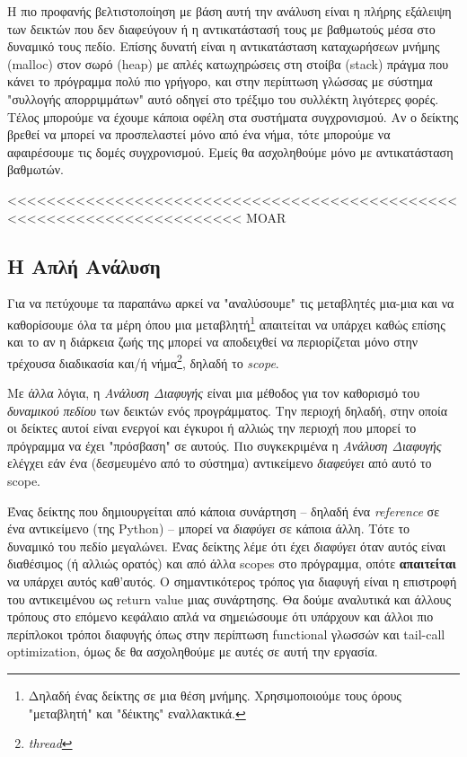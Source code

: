Η πιο προφανής βελτιστοποίηση με βάση αυτή την ανάλυση είναι η πλήρης εξάλειψη
των δεικτών που δεν διαφεύγουν ή η αντικατάστασή τους με βαθμωτούς μέσα στο
δυναμικό τους πεδίο. Επίσης δυνατή είναι η αντικατάσταση καταχωρήσεων μνήμης
(malloc) στον σωρό (heap) με απλές κατωχηρώσεις στη στοίβα (stack) πράγμα που
κάνει το πρόγραμμα πολύ πιο γρήγορο, και στην περίπτωση γλώσσας με σύστημα
"συλλογής απορριμμάτων" αυτό οδηγεί στο τρέξιμο του συλλέκτη λιγότερες φορές.
Τέλος μπορούμε να έχουμε κάποια οφέλη στα συστήματα συγχρονισμού. Αν ο δείκτης
βρεθεί να μπορεί να προσπελαστεί μόνο από ένα νήμα, τότε μπορούμε να 
αφαιρέσουμε τις δομές συγχρονισμού. Εμείς θα ασχοληθούμε μόνο με αντικατάσταση 
βαθμωτών.

<<<<<<<<<<<<<<<<<<<<<<<<<<<<<<<<<<<<<<<<<<<<<<<<<<<<<<<<<<<<<<<<<<<<<< MOAR


\subsection{Η Απλή Ανάλυση}

Για να πετύχουμε τα παραπάνω αρκεί να "αναλύσουμε" τις μεταβλητές μια-μια και
να καθορίσουμε όλα τα μέρη όπου μια μεταβλητή\footnote{Δηλαδή ένας δείκτης σε
μια θέση μνήμης. Χρησιμοποιούμε τους όρους "μεταβλητή" και "δέικτης"
εναλλακτικά.} απαιτείται να υπάρχει καθώς επίσης και το αν η διάρκεια ζωής της
μπορεί να αποδειχθεί να περιορίζεται μόνο στην τρέχουσα διαδικασία και/ή
νήμα\footnote{\textit{thread}}, δηλαδή το \textit{scope}.

Με άλλα λόγια, η \textit{Ανάλυση Διαφυγής} είναι μια μέθοδος για τον καθορισμό
του \textit{δυναμικού πεδίου} των δεικτών ενός προγράμματος. Την περιοχή δηλαδή,
στην οποία οι δείκτες αυτοί είναι ενεργοί και έγκυροι ή αλλιώς την περιοχή που
μπορεί το πρόγραμμα να έχει "πρόσβαση" σε αυτούς. Πιο συγκεκριμένα η
\textit{Ανάλυση Διαφυγής} ελέγχει εάν ένα (δεσμευμένο από το σύστημα)
αντικείμενο \textit{διαφεύγει} από αυτό το scope.

Ένας δείκτης που δημιουργείται από κάποια συνάρτηση – δηλαδή ένα
\textit{reference} σε ένα αντικείμενο (της Python) – μπορεί να \textit{διαφύγει}
σε κάποια άλλη. Τότε το δυναμικό του πεδίο μεγαλώνει. Ένας δείκτης λέμε ότι έχει
\textit{διαφύγει} όταν αυτός είναι διαθέσιμος (ή αλλιώς ορατός) και από άλλα
scopes στο πρόγραμμα, οπότε \textbf{απαιτείται} να υπάρχει αυτός καθ'αυτός. Ο
σημαντικότερος τρόπος για διαφυγή είναι η επιστροφή του αντικειμένου ως return
value μιας συνάρτησης. Θα δούμε αναλυτικά και άλλους τρόπους στο επόμενο
κεφάλαιο απλά να σημειώσουμε ότι υπάρχουν και άλλοι πιο περίπλοκοι τρόποι
διαφυγής όπως στην περίπτωση functional γλωσσών και tail-call optimization, όμως
δε θα ασχοληθούμε με αυτές σε αυτή την εργασία.

